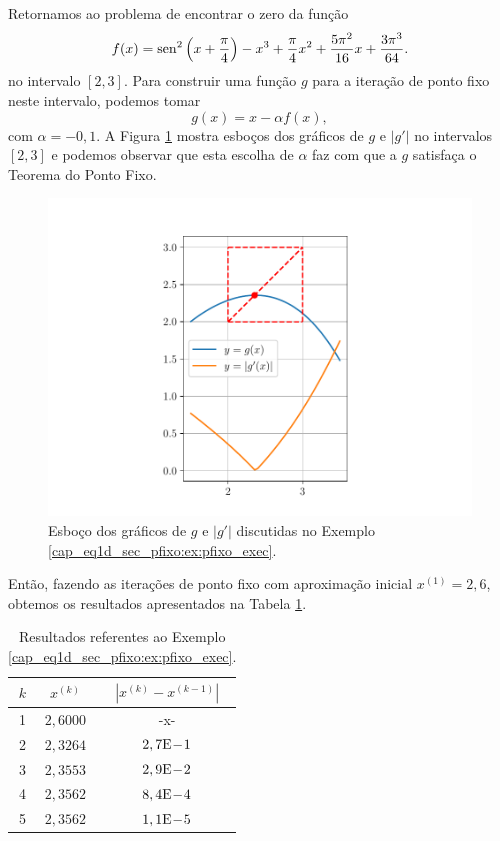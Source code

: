 \begin{ex}\label{cap_eq1d_sec_pfixo:ex:pfixo_exec}
  Retornamos ao problema de encontrar o zero da função
  \begin{equation}
    f(x) = \operatorname{sen}^2\left(x+\frac{\pi}{4}\right) - x^3 + \frac{\pi}{4}x^2 + \frac{5\pi^2}{16}x + \frac{3\pi^3}{64}.
  \end{equation}
  no intervalo $[2,3]$. Para construir uma função $g$ para a iteração de ponto fixo neste intervalo, podemos tomar
  \begin{equation}
    g(x) = x - \alpha f(x),
  \end{equation}
com $\alpha = -0,1$. A Figura \ref{cap_eq1d_sec_pfixo:fig:ex_pfixo_exec} mostra esboços dos gráficos de $g$ e $|g'|$ no intervalos $[2, 3]$ e podemos observar que esta escolha de $\alpha$ faz com que a $g$ satisfaça o Teorema do Ponto Fixo.

\begin{figure}[H]
  \centering
  \includegraphics[width=\textwidth]{./cap_eq1d/dados/fig_ex_pfixo_exec/fig}
  \caption{Esboço dos gráficos de $g$ e $|g'|$ discutidas no Exemplo \ref{cap_eq1d_sec_pfixo:ex:pfixo_exec}.}
  \label{cap_eq1d_sec_pfixo:fig:ex_pfixo_exec}
\end{figure}

Então, fazendo as iterações de ponto fixo com aproximação inicial $x^{(1)}=2,6$, obtemos os resultados apresentados na Tabela \ref{cap_eq1d_sec_pfixo:tab:ex_pfixo_exec}.

\begin{table}[H]
  \centering
  \caption{Resultados referentes ao Exemplo \ref{cap_eq1d_sec_pfixo:ex:pfixo_exec}.}
  \label{cap_eq1d_sec_pfixo:tab:ex_pfixo_exec}
  \begin{tabular}{r|cc}
    $k$ & $x^{(k)}$ & $|x^{(k)}-x^{(k-1)}|$ \\\hline
    1 & $2,6000$ & -x-\\
    2 & $2,3264$ & $2,7\mathrm{E}\!-\!1$ \\
    3 & $2,3553$ & $2,9\mathrm{E}\!-\!2$ \\
    4 & $2,3562$ & $8,4\mathrm{E}\!-\!4$ \\
    5 & $2,3562$ & $1,1\mathrm{E}\!-\!5$ \\\hline
  \end{tabular}
\end{table}


\end{ex}
